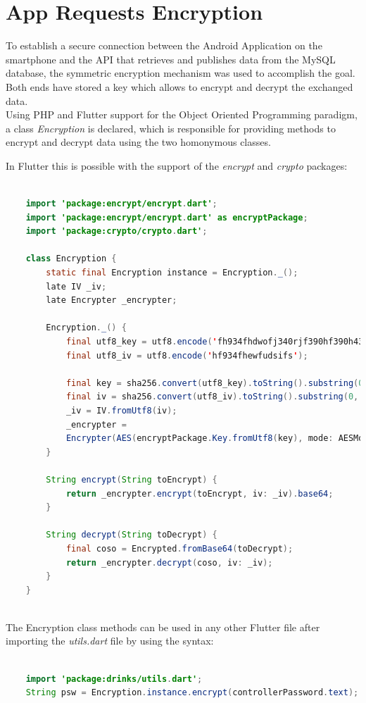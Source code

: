 \documentclass[target=bach,aauheader=,style=]{thud}
\begin{document}
\newpage
\section{App Requests Encryption}

To establish a secure connection between the Android Application on the smartphone and the API that retrieves and publishes data from the MySQL database, the symmetric encryption mechanism was used to accomplish the goal. Both ends have stored a key which allows to encrypt and decrypt the exchanged data.\\
Using PHP and Flutter support for the Object Oriented Programming paradigm, a class \emph{Encryption} is declared, which is responsible for providing methods to encrypt and decrypt data using the two homonymous classes.\par

In Flutter this is possible with the support of the \emph{encrypt} and \emph{crypto} packages:

\begin{lstlisting}[language=java,style=java]
	
	import 'package:encrypt/encrypt.dart';
	import 'package:encrypt/encrypt.dart' as encryptPackage;
	import 'package:crypto/crypto.dart';
	
	class Encryption {
		static final Encryption instance = Encryption._();
		late IV _iv;
		late Encrypter _encrypter;
		
		Encryption._() {
			final utf8_key = utf8.encode('fh934fhdwofj340rjf390hf390h43232');
			final utf8_iv = utf8.encode('hf934fhewfudsifs');
			
			final key = sha256.convert(utf8_key).toString().substring(0, 32);
			final iv = sha256.convert(utf8_iv).toString().substring(0, 16);
			_iv = IV.fromUtf8(iv);
			_encrypter =
			Encrypter(AES(encryptPackage.Key.fromUtf8(key), mode: AESMode.cbc));
		}
		
		String encrypt(String toEncrypt) {
			return _encrypter.encrypt(toEncrypt, iv: _iv).base64;
		}
		
		String decrypt(String toDecrypt) {
			final coso = Encrypted.fromBase64(toDecrypt);
			return _encrypter.decrypt(coso, iv: _iv);
		}
	}
	
\end{lstlisting}

The Encryption class methods can be used in any other Flutter file after importing the \emph{utils.dart} file by using the syntax:

\begin{lstlisting}[language=java,style=java]
	
	import 'package:drinks/utils.dart';
	String psw = Encryption.instance.encrypt(controllerPassword.text);
	
\end{lstlisting}
\newpage
\end{document}
